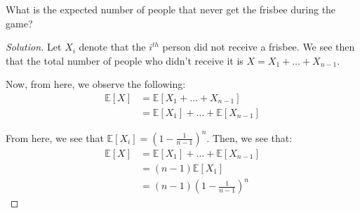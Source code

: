 \documentclass{article}
\newenvironment{solution}{\begin{proof}[Solution]}{\end{proof}}
\begin{document}
\begin{hw}
	What is the expected number of people that never get the frisbee during the game?
\end{hw}
\begin{solution}
	Let $X_{i}$ denote that the $i^{th}$ person did not receive a frisbee. We see then that the total number of people who didn't receive it is $X = X_{1} + \ldots + X_{n-1}$.
	
	Now, from here, we observe the following:
	\begin{align*}
		\mathbb{E}[X] &= \mathbb{E}[X_{1} + \ldots + X_{n-1}] \\
		&= \mathbb{E}[X_{1}] + \ldots + \mathbb{E}[X_{n-1}]
	\end{align*}

	From here, we see that $\mathbb{E}[X_{i}] = \left( 1 - \frac{1}{n-1} \right)^{n}$. Then, we see that:
	\begin{align*}
		\mathbb{E}[X] &= \mathbb{E}[X_{1}] + \ldots + \mathbb{E}[X_{n-1}] \\
		&= (n-1)\mathbb{E}[X_{1}] \\
		&= (n-1)\left( 1 - \frac{1}{n-1} \right)^{n}
	\end{align*}
\end{solution}

\newpage
\end{document}
